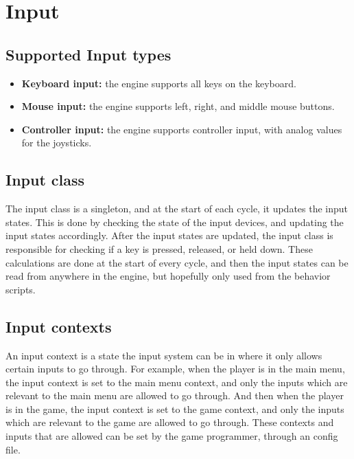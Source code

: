 \section{Input}
\subsection{Supported Input types}
\begin{itemize}
    \item \textbf{Keyboard input:} the engine supports all keys on the keyboard.
    \item \textbf{Mouse input:} the engine supports left, right, and middle mouse buttons.
    \item \textbf{Controller input:} the engine supports controller input, with analog values for the joysticks.
\end{itemize}

\subsection{Input class}
The input class is a singleton, and at the start of each cycle, it updates the input states.
This is done by checking the state of the input devices, and updating the input states accordingly.
After the input states are updated, the input class is responsible for checking if a key is pressed, released, or held down.
These calculations are done at the start of every cycle, and then the input states can be read from anywhere in the engine, but hopefully only used from the behavior scripts.

\subsection{Input contexts}
An input context is a state the input system can be in where it only allows certain inputs to go through.
For example, when the player is in the main menu, the input context is set to the main menu context, and only the inputs which are relevant to the main menu are allowed to go through.
And then when the player is in the game, the input context is set to the game context, and only the inputs which are relevant to the game are allowed to go through.
These contexts and inputs that are allowed can be set by the game programmer, through an config file.
